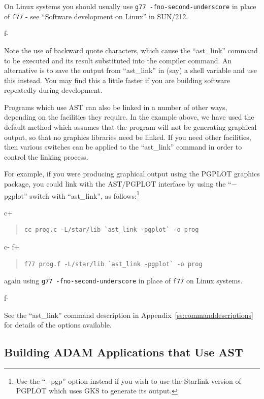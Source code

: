 \documentclass[twoside,11pt]{article}
\newcommand{\xref}[3]{#1}
\newcommand{\appref}[1]{Appendix~\ref{#1}}
\newcommand{\appref}[1]{\ref{#1}}
\begin{document}
On Linux systems you should usually use \verb+g77 -fno-second-underscore+ in
place of \verb+f77+ - see \xref{``Software development on Linux''}{sun212}
{software_development_on_linux} in \xref{SUN/212}{sun212}{}. 

f-

Note the use of backward quote characters, which cause the
``ast\_link'' command to be executed and its result substituted into
the compiler command. An alternative is to save the output from
``ast\_link'' in (say) a shell variable and use this instead. You may
find this a little faster if you are building software repeatedly
during development.

Programs which use AST can also be linked in a number of other ways,
depending on the facilities they require. In the example above, we
have used the default method which assumes that the program will not
be generating graphical output, so that no graphics libraries need be
linked. If you need other facilities, then various switches can be
applied to the ``ast\_link'' command in order to control the linking
process.

For example, if you were producing graphical output using the PGPLOT
graphics package, you could link with the AST/PGPLOT interface by
using the ``$-$pgplot'' switch with ``ast\_link'', as
follows:\footnote{Use the ``$-$pgp'' option instead if you wish to use
the Starlink version of PGPLOT which uses GKS to generate its output.}

c+
\begin{quote}
\small
\begin{verbatim}
cc prog.c -L/star/lib `ast_link -pgplot` -o prog
\end{verbatim}
\normalsize
\end{quote}
c-
f+
\begin{quote}
\small
\begin{verbatim}
f77 prog.f -L/star/lib `ast_link -pgplot` -o prog
\end{verbatim}
\normalsize
\end{quote}

again using \verb+g77 -fno-second-underscore+ in place of \verb+f77+ 
on Linux systems.

f-

See the ``ast\_link'' command description in
\appref{ss:commanddescriptions} for details of the options available.

\subsection{Building ADAM Applications that Use AST}
\end{document}
